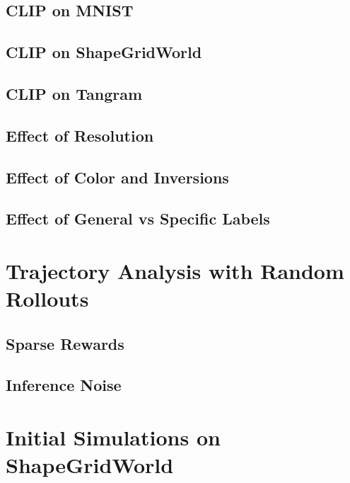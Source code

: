 \subsection{CLIP on MNIST}
\label{sec:clip-mnist}


\subsection{CLIP on ShapeGridWorld}
\label{sec:clip-sgw}


\subsection{CLIP on Tangram}
\label{sec:clip-tangram}


\subsection{Effect of Resolution}
\label{sec:clip-resolution}


\subsection{Effect of Color and Inversions}
\label{sec:clip-color}


\subsection{Effect of General vs Specific Labels}
\label{sec:clip-labels}



\section{Trajectory Analysis with Random Rollouts}
\label{sec:random-rollouts}


\subsection{Sparse Rewards} %
\label{sec:sparse-rewards}


\subsection{Inference Noise} %
\label{sec:inference-noise}



\section{Initial Simulations on ShapeGridWorld}
\label{sec:sgw-simulations}


